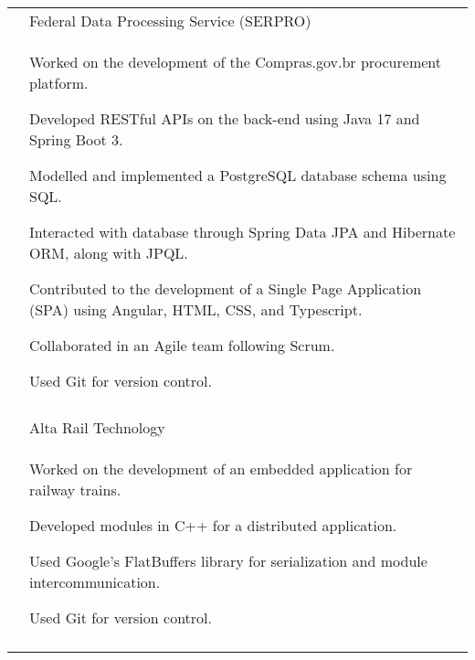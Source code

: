 \documentclass[a4paper,12pt]{article}
\begin{document}
\begin{longtable}{r|p{14.3cm}}
 & Federal Data Processing Service (SERPRO) \\*
 &\small{
    \begin{itemize*}[label=\Large\textbullet]
        \item Worked on the development of the Compras.gov.br procurement platform.
        \item Developed RESTful APIs on the back-end using Java 17 and Spring Boot 3.
        \item Modelled and implemented a \mbox{PostgreSQL} database schema using SQL.
        \item Interacted with database through Spring Data JPA and Hibernate ORM, along with JPQL.
        \item Contributed to the development of a Single Page Application (SPA) using Angular, HTML, CSS, and Typescript.
        \item Collaborated in an Agile team following Scrum.
        \item Used Git for version control.
     \end{itemize*}
}
 \\ \\

 & Alta Rail Technology \\*
 &\small{
    \begin{itemize*}[label=\Large\textbullet]
        \item Worked on the development of an embedded application for railway trains.
        \item \mbox{Developed} modules in C++ for a distributed application.
        \item Used Google's FlatBuffers library for \mbox{serialization} and module intercommunication.
        \item Used Git for version control.
     \end{itemize*}
 }
 \\ \\


\end{longtable}
\end{document}
